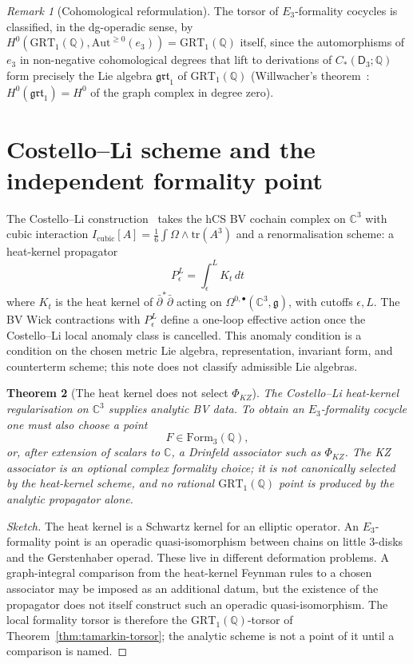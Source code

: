 \documentclass[11pt]{amsart}
\theoremstyle{plain}
\newtheorem{theorem}{Theorem}[section]
\theoremstyle{definition}
\theoremstyle{remark}
\newtheorem{remark}[theorem]{Remark}
\providecommand{\C}{\mathbb{C}}
\providecommand{\Q}{\mathbb{Q}}
\providecommand{\GRT}{\mathrm{GRT}}
\providecommand{\frakg}{\mathfrak{g}}
\begin{document}
\begin{remark}[Cohomological reformulation]
\label{rem:cohomological}
The torsor of $E_3$-formality cocycles is classified, in the dg-operadic sense, by $H^0(\GRT_1(\Q), \mathrm{Aut}^{\geq 0}(e_3)) = \GRT_1(\Q)$ itself, since the automorphisms of $e_3$ in non-negative cohomological degrees that lift to derivations of $C_*(\mathsf{D}_3; \Q)$ form precisely the Lie algebra $\mathfrak{grt}_1$ of $\GRT_1(\Q)$ \textup{(}Willwacher's theorem~\cite{Tamarkin2003}: $H^0(\mathfrak{grt}_1) = H^0$ of the graph complex in degree zero\textup{).}
\end{remark}

\section{Costello--Li scheme and the independent formality point}
\label{sec:costello-li}

The Costello--Li construction~\cite{CostelloLi2012} takes the hCS BV cochain complex on $\C^3$ with cubic interaction $I_{\mathrm{cubic}}[A] = \tfrac{1}{6}\int \Omega \wedge \mathrm{tr}(A^3)$ and a renormalisation scheme: a heat-kernel propagator
\[
  P^L_\epsilon = \int_\epsilon^L K_t \, dt
\]
where $K_t$ is the heat kernel of $\bar\partial^* \bar\partial$ acting on $\Omega^{0,\bullet}(\C^3, \frakg)$, with cutoffs $\epsilon, L$. The BV Wick contractions with $P^L_\epsilon$ define a one-loop effective action once the Costello--Li local anomaly class is cancelled. This anomaly condition is a condition on the chosen metric Lie algebra, representation, invariant form, and counterterm scheme; this note does not classify admissible Lie algebras.

\begin{theorem}[The heat kernel does not select $\Phi_{KZ}$]
\label{thm:costello-li-phi-kz}
The Costello--Li heat-kernel regularisation on $\C^3$ supplies
analytic BV data. To obtain an $E_3$-formality cocycle one must also
choose a point
\[
  F\in \mathrm{Form}_3(\Q),
\]
or, after extension of scalars to $\C$, a Drinfeld associator such as
$\Phi_{KZ}$. The KZ associator is an optional complex formality choice;
it is not canonically selected by the heat-kernel scheme, and no
rational $\GRT_1(\Q)$ point is produced by the analytic propagator
alone.
\end{theorem}

\begin{proof}[Sketch]
The heat kernel is a Schwartz kernel for an elliptic operator. An
$E_3$-formality point is an operadic quasi-isomorphism between chains
on little $3$-disks and the Gerstenhaber operad. These live in
different deformation problems. A graph-integral comparison from the
heat-kernel Feynman rules to a chosen associator may be imposed as an
additional datum, but the existence of the propagator does not itself
construct such an operadic quasi-isomorphism. The local formality
torsor is therefore the $\GRT_1(\Q)$-torsor of
Theorem~\ref{thm:tamarkin-torsor}; the analytic scheme is not a point
of it until a comparison is named.
\end{proof}
\end{document}
